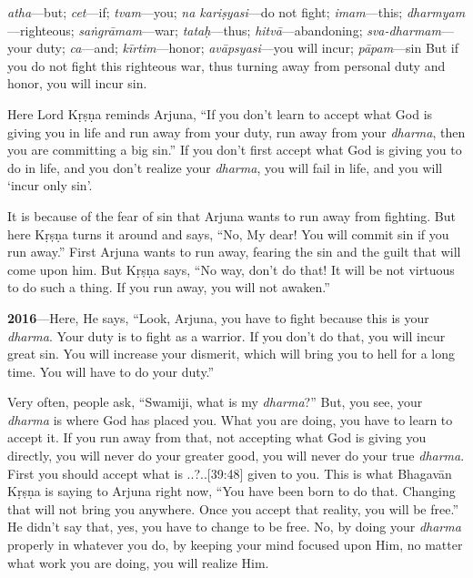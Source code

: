 {%
  \textit{atha}---but; 
  \textit{cet}---if; 
  \textit{tvam}---you; 
  \textit{na kariṣyasi}---do not fight; 
  \textit{imam}---this; 
  \textit{dharmyam}---righteous; 
  \textit{saṅgrāmam}---war; 
  \textit{tataḥ}---thus; 
  \textit{hitvā}---abandoning; 
  \textit{sva-dharmam}---your duty; 
  \textit{ca}---and; 
  \textit{kīrtim}---honor; 
  \textit{avāpsyasi}---you will incur; 
  \textit{pāpam}---sin
}
{%
  But if you do not fight this righteous war, thus turning away from personal duty and honor, you will incur sin.
}

Here Lord Kṛṣṇa reminds Arjuna, “If you don’t learn to accept what God is giving you in life and run away from your duty, run away from your \textit{dharma}, then you are committing a big sin.” If you don’t first accept what God is giving you to do in life, and you don’t realize your \textit{dharma}, you will fail in life, and you will ‘incur only sin’.

It is because of the fear of sin that Arjuna wants to run away from fighting. But here Kṛṣṇa turns it around and says, “No, My dear! You will commit sin if you run away.” First Arjuna wants to run away, fearing the sin and the guilt that will come upon him. But Kṛṣṇa says, “No way, don’t do that! It will be not virtuous to do such a thing. If you run away, you will not awaken.”

\textbf{2016}---Here, He says, “Look, Arjuna, you have to fight because this is your \textit{dharma}. Your duty is to fight as a warrior. If you don’t do that, you will incur great sin. You will increase your dismerit, which will bring you to hell for a long time. You will have to do your duty.”

Very often, people ask, “Swamiji, what is my \textit{dharma}?” But, you see, your \textit{dharma} is where God has placed you. What you are doing, you have to learn to accept it. If you run away from that, not accepting what God is giving you directly, you will never do your greater good, you will never do your true \textit{dharma}. First you should accept what is ..?..[39:48] given to you. This is what Bhagavān Kṛṣṇa is saying to Arjuna right now, “You have been born to do that. Changing that will not bring you anywhere. Once you accept that reality, you will be free.” He didn’t say that, yes, you have to change to be free. No, by doing your \textit{dharma} properly in whatever you do, by keeping your mind focused upon Him, no matter what work you are doing, you will realize Him.

